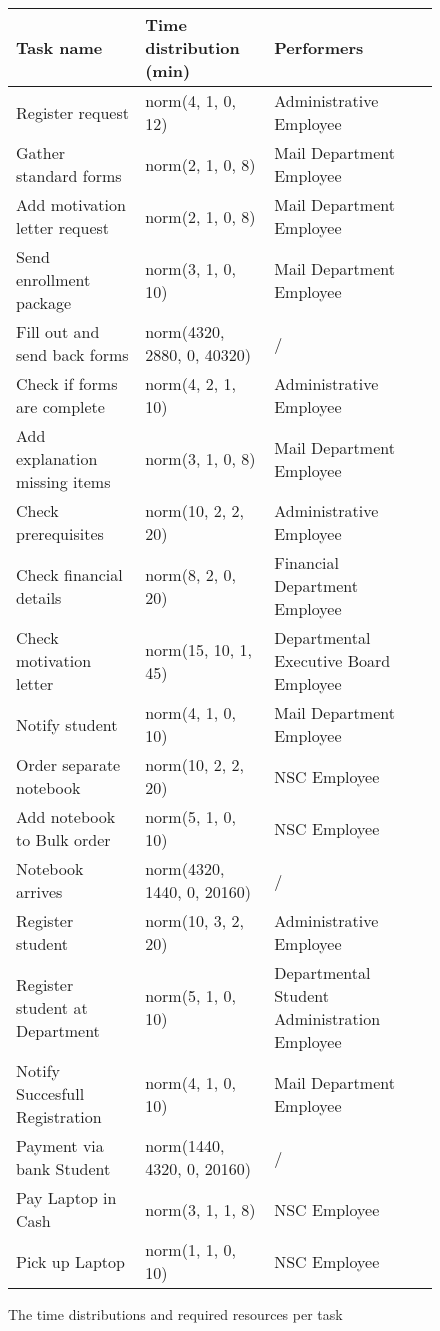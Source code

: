 \begin{figure}[h!]
	\centering
	\begin{tabularx}{\textwidth}{ | X | X | X | }
		\hline
		\textbf{Task name} & \textbf{Time distribution (min)} & \textbf{Performers}\\ \hline\hline
		Register request & norm(4, 1, 0, 12) & Administrative Employee \\ \hline
		Gather standard forms & norm(2, 1, 0, 8) & Mail Department Employee \\ \hline
		Add motivation letter request & norm(2, 1, 0, 8) & Mail Department Employee \\ \hline
		Send enrollment package & norm(3, 1, 0, 10) & Mail Department Employee \\ \hline
		Fill out and send back forms & norm(4320, 2880, 0, 40320) & / \\ \hline
		Check if forms are complete & norm(4, 2, 1, 10) & Administrative Employee \\ \hline
		Add explanation missing items & norm(3, 1, 0, 8) & Mail Department Employee \\ \hline	
		Check prerequisites & norm(10, 2, 2, 20) & Administrative Employee \\ \hline
		Check financial details & norm(8, 2, 0, 20) & Financial Department Employee \\ \hline
		Check motivation letter & norm(15, 10, 1, 45) & Departmental Executive Board Employee \\ \hline
		Notify student & norm(4, 1, 0, 10) & Mail Department Employee \\ \hline
		Order separate notebook & norm(10, 2, 2, 20) & NSC Employee \\ \hline
		Add notebook to Bulk order & norm(5, 1, 0, 10) & NSC Employee \\ \hline
		Notebook arrives & norm(4320, 1440, 0, 20160) & / \\ \hline
		Register student & norm(10, 3, 2, 20) & 
		Administrative Employee \\ \hline
		Register student at Department & norm(5, 1, 0, 10) & Departmental Student Administration Employee \\ \hline
		Notify Succesfull Registration & norm(4, 1, 0, 10) & Mail Department Employee \\ \hline
		Payment via bank Student & norm(1440, 4320, 0, 20160) & / \\ \hline
		Pay Laptop in Cash & norm(3, 1, 1, 8) & NSC Employee \\ \hline
		Pick up Laptop & norm(1, 1, 0, 10) & NSC Employee \\
		\hline
	\end{tabularx}
	\caption{The time distributions and required resources per task}
	\label{fig:tasktimes1}
\end{figure}
	
